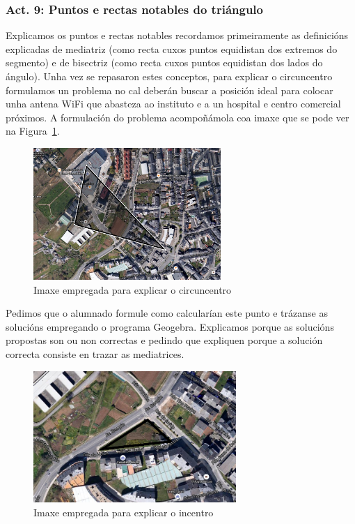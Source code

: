 \subsubsection{Act. 9: Puntos e rectas notables do triángulo}\label{act9}
Explicamos os puntos e rectas notables recordamos primeiramente as definicións explicadas de mediatriz (como recta cuxos puntos equidistan dos extremos do segmento) e de bisectriz (como recta cuxos puntos equidistan dos lados do ángulo). Unha vez se repasaron estes conceptos, para explicar o circuncentro formulamos un problema no cal deberán buscar a posición ideal para colocar unha antena WiFi que abasteza ao instituto e a un hospital e centro comercial próximos. A formulación do problema acompoñámola coa imaxe que se pode ver na Figura~\ref{fig:act12-1}.

\begin{figure}[h!]
  \centering
  \includegraphics[height=5cm]{img/circuncentro.png}
  \caption{Imaxe empregada para explicar o circuncentro}\label{fig:act12-1}
\end{figure}

Pedimos que o alumnado formule como calcularían este punto e trázanse as solucións empregando o programa Geogebra. Explicamos porque as solucións propostas son ou non correctas e pedindo que expliquen porque a solución correcta consiste en trazar as mediatrices.

\begin{figure}[h!]
  \centering
  \includegraphics[height=5cm]{img/incentro.png}
  \caption{Imaxe empregada para explicar o incentro}\label{fig:act12-2}
\end{figure}

